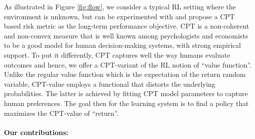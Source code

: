 As illustrated in Figure \ref{fig:flow}, we consider a typical RL setting where the environment is unknown, but can be experimented with and propose a CPT based risk metric as the long-term performance objective.  
CPT is a non-coherent and non-convex measure 
that is well known among psychologists and economists to be a good model for human decision-making systems, with strong empirical support.
To put it differently, CPT captures well the way humans evaluate outcomes and hence, we offer a CPT-variant of the RL notion of ``value function''. Unlike the regular value function which is the expectation of the return random variable, CPT-value employs a functional that distorts the underlying probabilities. The latter is achieved by fitting CPT model parameters to capture human preferences. The goal then for the learning system is to find a policy that maximizes the CPT-value of ``return''. 
\fi
%
%

\paragraph{Our contributions:}

